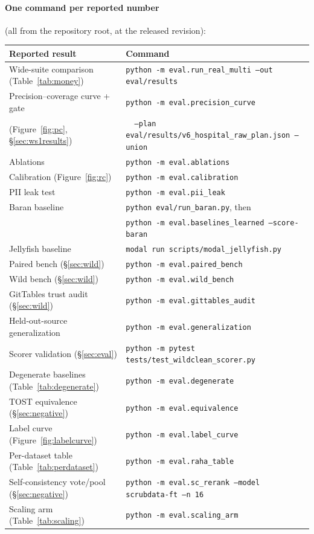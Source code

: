 \documentclass[11pt]{article}
\begin{document}
\paragraph{One command per reported number} (all from the repository root, at the
released revision):

\begin{center}
\footnotesize
\begin{tabular}{@{}ll@{}}
\toprule
Reported result & Command \\
\midrule
Wide-suite comparison (Table~\ref{tab:money}) & \texttt{python -m eval.run\_real\_multi --out eval/results} \\
Precision--coverage curve + gate & \texttt{python -m eval.precision\_curve} \\
\quad (Figure~\ref{fig:pc}, \S\ref{sec:ws1results}) & \texttt{\ \ --plan eval/results/v6\_hospital\_raw\_plan.json --union} \\
Ablations & \texttt{python -m eval.ablations} \\
Calibration (Figure~\ref{fig:rc}) & \texttt{python -m eval.calibration} \\
PII leak test & \texttt{python -m eval.pii\_leak} \\
Baran baseline & \texttt{python eval/run\_baran.py}, then \\
 & \texttt{python -m eval.baselines\_learned --score-baran} \\
Jellyfish baseline & \texttt{modal run scripts/modal\_jellyfish.py} \\
\midrule
Paired bench (\S\ref{sec:wild}) & \texttt{python -m eval.paired\_bench} \\
Wild bench (\S\ref{sec:wild}) & \texttt{python -m eval.wild\_bench} \\
GitTables trust audit (\S\ref{sec:wild}) & \texttt{python -m eval.gittables\_audit} \\
Held-out-source generalization & \texttt{python -m eval.generalization} \\
\midrule
Scorer validation (\S\ref{sec:eval}) & \texttt{python -m pytest tests/test\_wildclean\_scorer.py} \\
Degenerate baselines (Table~\ref{tab:degenerate}) & \texttt{python -m eval.degenerate} \\
TOST equivalence (\S\ref{sec:negative}) & \texttt{python -m eval.equivalence} \\
Label curve (Figure~\ref{fig:labelcurve}) & \texttt{python -m eval.label\_curve} \\
Per-dataset table (Table~\ref{tab:perdataset}) & \texttt{python -m eval.raha\_table} \\
Self-consistency vote/pool (\S\ref{sec:negative}) & \texttt{python -m eval.sc\_rerank --model scrubdata-ft --n 16} \\
Scaling arm (Table~\ref{tab:scaling}) & \texttt{python -m eval.scaling\_arm} \\
\bottomrule
\end{tabular}
\end{center}
\end{document}
